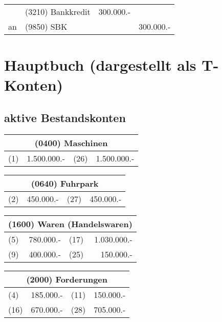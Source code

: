 \documentclass[parskip=half,12pt,a4paper]{scrartcl}
\begin{document}
\begin{center}
	\begin{tabularx}{\textwidth}{rXrr}
		\toprule
		& (3210) Bankkredit & 300.000.- &\\
		an & (9850) SBK & & 300.000.-\\
		\bottomrule
	\end{tabularx}
\end{center}

\section{Hauptbuch (dargestellt als T-Konten)}

\subsection{aktive Bestandskonten}

\begin{center}
	\begin{tabular}{lr|lr}
		\multicolumn{4}{c}{(0400) Maschinen}\\
		\toprule
		(1) & 1.500.000.- & (26) & 1.500.000.-\\
		\bottomrule
	\end{tabular}
\end{center}

\begin{center}
	\begin{tabular}{lr|lr}
		\multicolumn{4}{c}{(0640) Fuhrpark}\\
		\toprule
		(2) & 450.000.- & (27) & 450.000.-\\
		\bottomrule
	\end{tabular}
\end{center}

\begin{center}
	\begin{tabular}{lr|lr}
		\multicolumn{4}{c}{(1600) Waren (Handelswaren)}\\
		\toprule
		(5) & 780.000.- & (17) & 1.030.000.-\\
		(9) & 400.000.- & (25) & 150.000.-\\
		\bottomrule
	\end{tabular}
\end{center}

\begin{center}
	\begin{tabular}{lr|lr}
		\multicolumn{4}{c}{(2000) Forderungen}\\
		\toprule
		(4) & 185.000.- & (11) & 150.000.-\\
		(16) & 670.000.- & (28) & 705.000.-\\
		\bottomrule
	\end{tabular}
\end{center}
\end{document}
